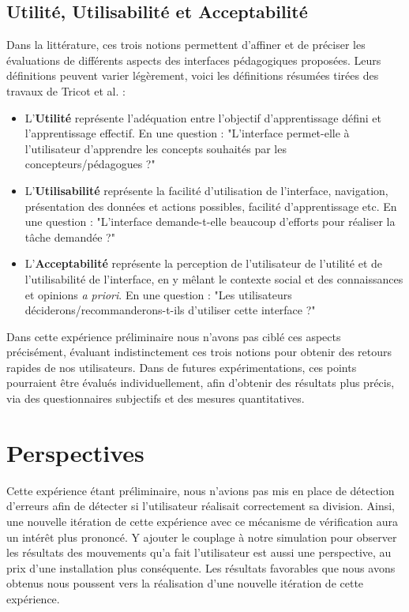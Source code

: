 	 
		
		\subsection{Utilité, Utilisabilité et Acceptabilité}
		Dans la littérature, ces trois notions permettent d'affiner et de préciser les évaluations de différents aspects des interfaces pédagogiques proposées. Leurs définitions peuvent varier légèrement, voici les définitions résumées tirées des travaux de Tricot et al. \cite{tricot_utilite_2003} :
		\begin{itemize}
			\item L'\textbf{Utilité} représente l'adéquation entre l'objectif d'apprentissage défini et l'apprentissage effectif. En une question : "L'interface permet-elle à l'utilisateur d'apprendre les concepts souhaités par les concepteurs/pédagogues ?"
			\item L'\textbf{Utilisabilité} représente la facilité d'utilisation de l'interface, navigation, présentation des données et actions possibles, facilité d'apprentissage etc. En une question : "L'interface demande-t-elle beaucoup d'efforts pour réaliser la tâche demandée ?"
			\item L'\textbf{Acceptabilité} représente la perception de l'utilisateur de l'utilité et de l'utilisabilité de l'interface, en y mêlant le contexte social et des connaissances et opinions \textit{a priori}. En une question : "Les utilisateurs déciderons/recommanderons-t-ils d'utiliser cette interface ?"
		\end{itemize}
		
		Dans cette expérience préliminaire nous n'avons pas ciblé ces aspects précisément, évaluant indistinctement ces trois notions pour obtenir des retours rapides de nos utilisateurs. Dans de futures expérimentations, ces points pourraient être évalués individuellement, afin d'obtenir des résultats plus précis, via des questionnaires subjectifs et des mesures quantitatives.
	
	\section{Perspectives}
 	Cette expérience étant préliminaire, nous n'avions pas mis en place de détection d'erreurs afin de détecter si l'utilisateur réalisait correctement sa division. Ainsi, une nouvelle itération de cette expérience avec ce mécanisme de vérification aura un intérêt plus prononcé. Y ajouter le couplage à notre simulation pour observer les résultats des mouvements qu'a fait l'utilisateur est aussi une perspective, au prix d'une installation plus conséquente. Les résultats favorables que nous avons obtenus nous poussent vers la réalisation d'une nouvelle itération de cette expérience.
	
